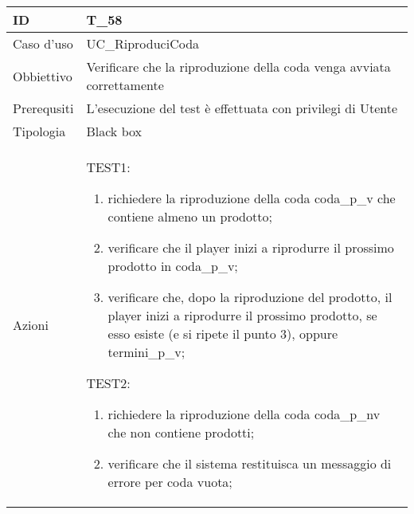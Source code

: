 \begin{table}[hb]
    \centering
    \begin{tabular}{ |p{2cm}|p{10cm}|  }
        \hline
        ID          & T\_58                                                              \\\hline
        Caso d'uso  & UC\_RiproduciCoda                                             \\\hline
        Obbiettivo  & Verificare che la riproduzione della coda venga avviata correttamente \\\hline
        Prerequsiti & L'esecuzione del test è effettuata con privilegi di Utente \\\hline
        Tipologia   & Black box                                                          \\\hline
        Azioni      &
        TEST1:
        \begin{enumerate}[nosep, topsep=0pt]
            \item richiedere la riproduzione della coda coda\_p\_v che contiene almeno un prodotto; 
            \item verificare che il player inizi a riprodurre il prossimo prodotto in coda\_p\_v;
            \item verificare che, dopo la riproduzione del prodotto, il player inizi a riprodurre
             il prossimo prodotto, se esso esiste (e si ripete il punto 3), oppure termini\_p\_v;
        \end{enumerate}
        \vspace{0.5cm} TEST2:
        \begin{enumerate}[nosep, topsep=0pt]
            \item richiedere la riproduzione della coda coda\_p\_nv che non contiene prodotti; 
            \item verificare che il sistema restituisca un messaggio di errore per coda vuota;
        \end{enumerate}
        \\\hline
    \end{tabular}
\end{table}

